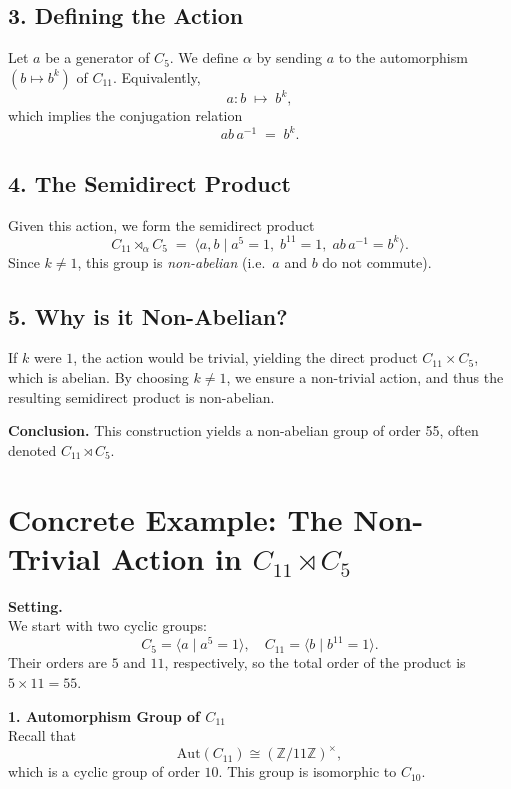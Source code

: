 \documentclass[12pt]{article}
\theoremstyle{definition} %
\theoremstyle{plain} %
\begin{document}
\subsection*{3. Defining the Action}
Let \(a\) be a generator of \(C_{5}\). We define \(\alpha\) by sending 
\(\displaystyle a\) to the automorphism \(\displaystyle (b \mapsto b^k)\) of \(C_{11}\). 
Equivalently,
\[
a : b \;\mapsto\; b^k,
\]
which implies the conjugation relation
\[
a b \, a^{-1} \;=\; b^k.
\]

\subsection*{4. The Semidirect Product}
Given this action, we form the semidirect product
\[
C_{11} \rtimes_{\alpha} C_{5}
\;=\;
\langle a, b \mid a^5 = 1,\; b^{11} = 1,\; a b\, a^{-1} = b^k \rangle.
\]
Since \(k \neq 1\), this group is \emph{non-abelian} (i.e.\ \(a\) and \(b\) do not commute).

\subsection*{5. Why is it Non-Abelian?}
If \(k\) were \(1\), the action would be trivial, yielding the direct product 
\(C_{11} \times C_{5}\), which is abelian. 
By choosing \(k \neq 1\), we ensure a non-trivial action, and thus the resulting 
semidirect product is non-abelian.

\bigskip
\noindent
\textbf{Conclusion.} This construction yields a non-abelian group of order 55, 
often denoted \(C_{11} \rtimes C_{5}\).


\section*{Concrete Example: The Non-Trivial Action in \(C_{11} \rtimes C_5\)}

\noindent
\textbf{Setting.} \\
We start with two cyclic groups:
\[
C_{5} = \langle a \mid a^5 = 1 \rangle, \quad
C_{11} = \langle b \mid b^{11} = 1 \rangle.
\]
Their orders are \(5\) and \(11\), respectively, so the total order of the product is \(5 \times 11 = 55\).

\medskip

\noindent
\textbf{1. Automorphism Group of \(C_{11}\)} \\
Recall that 
\[
\mathrm{Aut}(C_{11}) \cong (\mathbb{Z}/11\mathbb{Z})^\times,
\]
which is a cyclic group of order \(10\). This group is isomorphic to \(C_{10}\).
\end{document}
